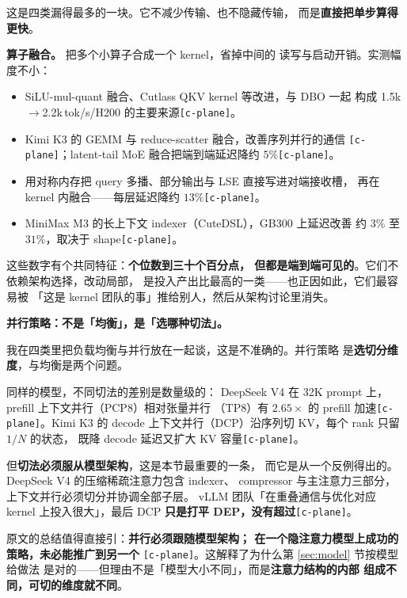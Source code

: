 这是四类漏得最多的一块。它不减少传输、也不隐藏传输，
而是\textbf{直接把单步算得更快}。

\noindent\textbf{算子融合。} 把多个小算子合成一个 kernel，省掉中间的
读写与启动开销。实测幅度不小：

\begin{itemize}[leftmargin=1.3em,itemsep=1pt,topsep=2pt]
  \item SiLU-mul-quant 融合、Cutlass QKV kernel 等改进，与 DBO 一起
        构成 1.5k$\to$2.2k\,tok/s/H200 的主要来源\texttt{[c-plane]}。
  \item Kimi K3 的 GEMM 与 reduce-scatter 融合，改善序列并行的通信
        \texttt{[c-plane]}；latent-tail MoE 融合把端到端延迟降约
        $5\%$\texttt{[c-plane]}。
  \item 用对称内存把 query 多播、部分输出与 LSE 直接写进对端接收槽，
        再在 kernel 内融合——每层延迟降约 $13\%$\texttt{[c-plane]}。
  \item MiniMax M3 的长上下文 indexer（CuteDSL），GB300 上延迟改善
        约 $3\%$ 至 $31\%$，取决于 shape\texttt{[c-plane]}。
\end{itemize}

\noindent 这些数字有个共同特征：\textbf{个位数到三十个百分点，
但都是端到端可见的}。它们不依赖架构选择，改动局部，
是投入产出比最高的一类——也正因如此，它们最容易被
「这是 kernel 团队的事」推给别人，然后从架构讨论里消失。

\noindent\textbf{并行策略：不是「均衡」，是「选哪种切法」。}

我在四类里把负载均衡与并行放在一起谈，这是不准确的。并行策略
是\textbf{选切分维度}，与均衡是两个问题。

\noindent 同样的模型，不同切法的差别是数量级的：
DeepSeek V4 在 32K prompt 上，prefill 上下文并行（PCP8）相对张量并行
（TP8）有 $2.65\times$ 的 prefill 加速\texttt{[c-plane]}。Kimi K3 的
decode 上下文并行（DCP）沿序列切 KV，每个 rank 只留 $1/N$ 的状态，
既降 decode 延迟又扩大 KV 容量\texttt{[c-plane]}。

\noindent 但\textbf{切法必须服从模型架构}，这是本节最重要的一条，
而它是从一个反例得出的。DeepSeek V4 的压缩稀疏注意力包含 indexer、
compressor 与主注意力三部分，上下文并行必须切分并协调全部子层。
vLLM 团队「在重叠通信与优化对应 kernel 上投入很大」，最后
DCP \textbf{只是打平 DEP，没有超过}\texttt{[c-plane]}。

\noindent 原文的总结值得直接引：\textbf{并行必须跟随模型架构；
在一个隐注意力模型上成功的策略，未必能推广到另一个}
\texttt{[c-plane]}。这解释了为什么第 \ref{sec:model} 节按模型给做法
是对的——但理由不是「模型大小不同」，而是\textbf{注意力结构的内部
组成不同，可切的维度就不同}。


